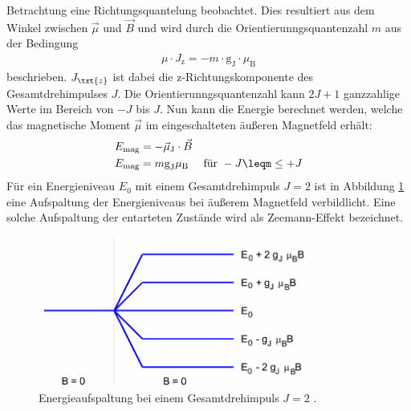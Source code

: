 Betrachtung eine Richtungsquantelung beobachtet. Dies resultiert aus dem Winkel
zwischen $\vec{\mu}$ und $\vec{B}$ und wird durch die
Orientierunngsquantenzahl $m$ aus der Bedingung
\begin{align}
  \mu \cdot J_\text{z} = - m \cdot \text{g}_\text{J}\cdot \mu_\text{B}
  \label{eqn:bedingung}
\end{align}
beschrieben. $J_\txt{z}$ ist dabei die z-Richtungskomponente des Gesamtdrehimpulses
$J$. Die Orientierunngsquantenzahl kann $2J+1$ ganzzahlige Werte im Bereich von
$-J$ bis $J$.
Nun kann die Energie berechnet werden, welche das magnetische Moment $\vec{\mu}$
im eingeschalteten äußeren Magnetfeld erhält:
\begin{align}
  E_\text{mag} &= -\vec{\mu}_\text{J} \cdot \vec{B} \\
  E_\text{mag} &= m \text{g}_\text{J} \mu_\text{B} \quad \text{ für } -J\leqm\leq+J
  \label{eqn:energie}
\end{align}
Für ein Energieniveau $E_0$ mit einem Gesamtdrehimpuls $J = \num{2}$ ist in Abbildung
\ref{abb:aufspaltung} eine Aufspaltung der Energieniveaus bei äußerem Magnetfeld
verbildlicht. Eine solche Aufspaltung der entarteten Zustände wird als Zeemann-Effekt
bezeichnet.
\begin{figure}[htb]
  \centering
  \includegraphics[width=0.8\textwidth]{images/V27_1.pdf}
  \caption{Energieaufspaltung bei einem Gesamtdrehimpuls $J = \num{2}$ \cite{anleitung}.}
  \label{abb:aufspaltung}
\end{figure}

